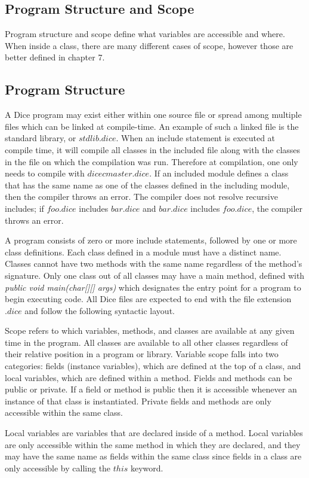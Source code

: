 \begin{homeworkProblem}
	\section{Program Structure and Scope}
	
	Program structure and scope define what variables are accessible and where. When inside a class, there are many different cases of scope, however those are better defined in chapter 7. 
	
	\subsection{Program Structure}
	
	A Dice program may exist either within one source file or spread among multiple files which can be linked at compile-time. An example of such a linked file is the standard library, or $stdlib.dice$. When an include statement is executed at compile time, it will compile all classes in the included file along with the classes in the file on which the compilation was run. Therefore at compilation, one only needs to compile with $dicec master.dice$. If an included module defines a class that has the same name as one of the classes defined in the including module, then the compiler throws an error. The compiler does not resolve recursive includes; if $foo.dice$ includes $bar.dice$ and $bar.dice$ includes $foo.dice$, the compiler throws an error.
	
	A program consists of zero or more include statements, followed by one or more class definitions. Each class defined in a module must have a distinct name. Classes cannot have two methods with the same name regardless of the method's signature. Only one class out of all classes may have a main method, defined with \textit{public void main(char[][] args)} which designates the entry point for a program to begin executing code. All Dice files are expected to end with the file extension $.dice$ and follow the following syntactic layout. 
	
	Scope refers to which variables, methods, and classes are available at any given time in the program. All classes are available to all other classes regardless of their relative position in a program or library. Variable scope falls into two categories: fields (instance variables), which are defined at the top of a class, and local variables, which are defined within a method. Fields and methods can be public or private. If a field or method is public then it is accessible whenever an instance of that class is instantiated. Private fields and methods are only accessible within the same class.
	
	Local variables are variables that are declared inside of a method. Local variables are only accessible within the same method in which they are declared, and they may have the same name as fields within the same class since fields in a class are only accessible by calling the $this$ keyword.\\
	
\end{homeworkProblem}
